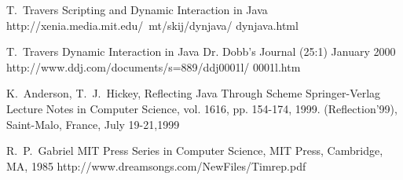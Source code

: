 \documentclass[final]{ieee}
\begin{document}
\begin{thebibliography}{1}
T.~Travers
\newblock Scripting and Dynamic Interaction in Java
\newblock http://xenia.media.mit.edu/~mt/skij/dynjava/ dynjava.html

T.~Travers
\newblock Dynamic Interaction in Java
\newblock Dr. Dobb's Journal (25:1) January 2000
\newblock http://www.ddj.com/documents/s=889/ddj0001l/ 0001l.htm

K.~Anderson, T.~J.~Hickey,
\newblock Reflecting Java Through Scheme
\newblock Springer-Verlag Lecture Notes in Computer Science, vol. 1616, pp. 154-174, 1999.
\newblock (Reflection'99), Saint-Malo, France, July 19-21,1999

R.~P.~Gabriel
\newblock MIT Press Series in Computer Science, MIT Press, Cambridge, MA, 1985
\newblock http://www.dreamsongs.com/NewFiles/Timrep.pdf

\end{thebibliography}
\end{document}
